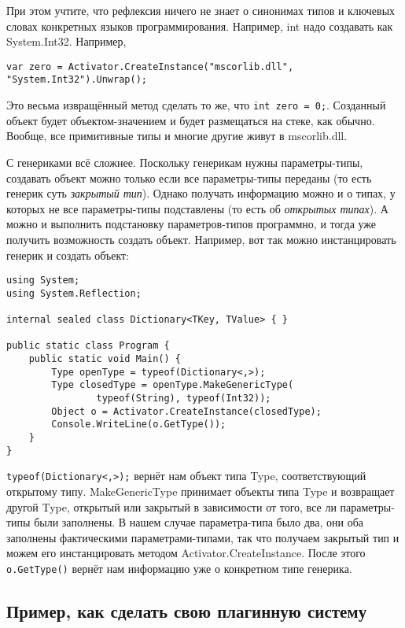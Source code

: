 \documentclass[a5paper]{article}
\begin{document}
При этом учтите, что рефлексия ничего не знает о синонимах типов и ключевых словах конкретных языков программирования. Например, int надо создавать как System.Int32. Например, 

\begin{verbatim}
var zero = Activator.CreateInstance("mscorlib.dll", "System.Int32").Unwrap();
\end{verbatim}

Это весьма извращённый метод сделать то же, что \texttt{int zero = 0;}. Созданный объект будет объектом-значением и будет размещаться на стеке, как обычно. Вообще, все примитивные типы и многие другие живут в mscorlib.dll.

С генериками всё сложнее. Поскольку генерикам нужны параметры-типы, создавать объект можно только если все параметры-типы переданы (то есть генерик суть \textit{закрытый тип}). Однако получать информацию можно и о типах, у которых не все параметры-типы подставлены (то есть об \textit{открытых типах}). А можно и выполнить подстановку параметров-типов программно, и тогда уже получить возможность создать объект. Например, вот так можно инстанцировать генерик и создать объект:

\begin{verbatim}
using System;
using System.Reflection;

internal sealed class Dictionary<TKey, TValue> { }

public static class Program {
    public static void Main() {
        Type openType = typeof(Dictionary<,>);
        Type closedType = openType.MakeGenericType(
                typeof(String), typeof(Int32));
        Object o = Activator.CreateInstance(closedType);
        Console.WriteLine(o.GetType());
    }
}
\end{verbatim}

\texttt{typeof(Dictionary<,>);} вернёт нам объект типа Type, соответствующий открытому типу. MakeGenericType принимает объекты типа Type и возвращает другой Type, открытый или закрытый в зависимости от того, все ли параметры-типы были заполнены. В нашем случае параметра-типа было два, они оба заполнены фактическими параметрами-типами, так что получаем закрытый тип и можем его инстанцировать методом Activator.CreateInstance. После этого \texttt{o.GetType()} вернёт нам информацию уже о конкретном типе генерика.

\subsection{Пример, как сделать свою плагинную систему}
\end{document}
